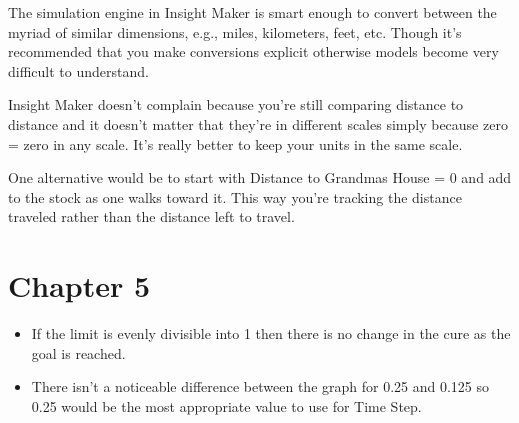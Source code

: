 \documentclass[]{memoir}
\begin{document}

The simulation engine in Insight Maker is smart enough to convert
between the myriad of similar dimensions, e.g., miles, kilometers, feet,
etc. Though it's recommended that you make conversions explicit
otherwise models become very difficult to understand.

Insight Maker doesn't complain because you're still comparing distance
to distance and it doesn't matter that they're in different scales
simply because zero = zero in any scale. It's really better to keep your
units in the same scale.


One alternative would be to start with Distance to Grandmas House = 0
and add to the stock as one walks toward it. This way you're tracking
the distance traveled rather than the distance left to travel.

\section{Chapter 5}


\begin{itemize}
\itemsep1pt\parskip0pt
\item
  If the limit is evenly divisible into 1 then there is no change in the
  cure as the goal is reached.
\item
  There isn't a noticeable difference between the graph for 0.25 and
  0.125 so 0.25 would be the most appropriate value to use for Time
  Step.
\end{itemize}

\end{document}
